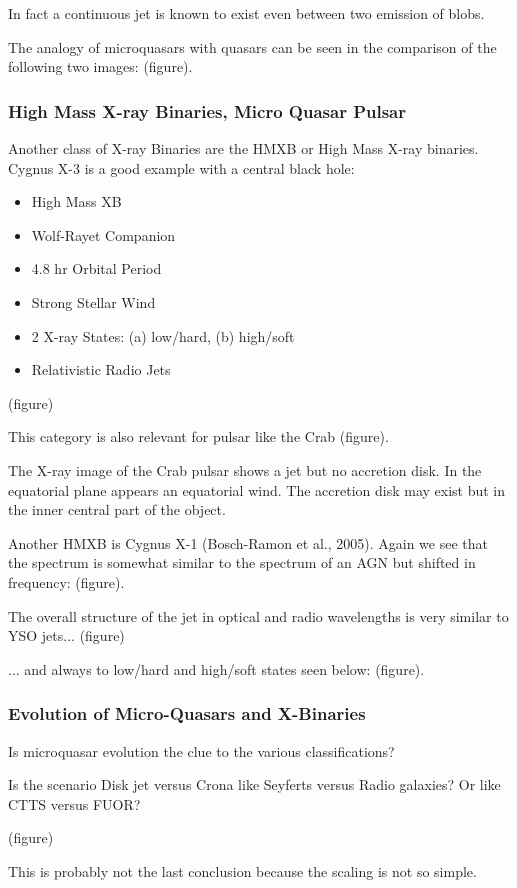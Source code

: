 \documentclass[10pt,a4paper,english]{article}
\begin{document}
In fact a continuous jet is known to exist even between two emission
of blobs.

The analogy of microquasars with quasars can be seen in the comparison
of the following two images: (figure).

\subsubsection{High Mass X-ray Binaries, Micro Quasar Pulsar}
Another class of X-ray Binaries are the HMXB or High Mass X-ray binaries. Cygnus X-3 is a good example with a central black hole:
\begin{itemize}
    \item High Mass XB
    \item Wolf-Rayet Companion
    \item 4.8 hr Orbital Period
    \item Strong Stellar Wind
    \item 2 X-ray States: (a) low/hard, (b) high/soft
    \item Relativistic Radio Jets
\end{itemize}

(figure)

This category is also relevant for pulsar like the Crab (figure).

The X-ray image of the Crab pulsar shows a jet but no accretion disk. In the equatorial plane appears an equatorial wind. The accretion disk may exist but in the inner central part of the object.

Another HMXB is Cygnus X-1 (Bosch-Ramon et al., 2005). Again we see that the spectrum is somewhat similar to the spectrum of an AGN but shifted in frequency: (figure).

The overall structure of the jet in optical and radio wavelengths is very similar to YSO jets... (figure)

... and always to low/hard and high/soft states seen below: (figure).

\subsubsection{Evolution of Micro-Quasars and X-Binaries}
Is microquasar evolution the clue to the various classifications?

Is the scenario Disk jet versus Crona like Seyferts versus Radio galaxies? Or like CTTS versus FUOR?

(figure)

This is probably not the last conclusion because the scaling is not so simple.
\end{document}
